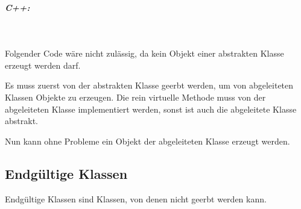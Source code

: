 		\subparagraph*{C++:}\mbox{}\\
			\UseRawInputEncoding{}
			
			Folgender Code wäre nicht zulässig, da kein Objekt einer abstrakten Klasse erzeugt werden darf.
			\UseRawInputEncoding{}
			
			Es muss zuerst von der abstrakten Klasse geerbt werden, um von abgeleiteten Klassen Objekte zu erzeugen. Die rein
			virtuelle Methode muss von der abgeleiteten Klasse implementiert werden, sonst ist auch die abgeleitete Klasse
			abstrakt.
			\UseRawInputEncoding{}
			
			Nun kann ohne Probleme ein Objekt der abgeleiteten Klasse erzeugt werden.
			\UseRawInputEncoding{}
	
	\subsection{Endgültige Klassen}
		Endgültige Klassen sind Klassen, von denen nicht geerbt werden kann.
		\UseRawInputEncoding{}
